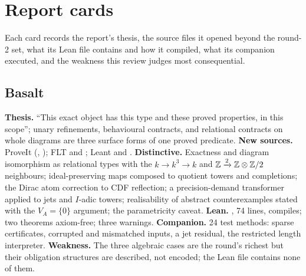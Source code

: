\section{Report cards}\label{app:cards}
Each card records the report's thesis, the source files it opened beyond the round-2 set, what its Lean file contains and how it compiled, what its companion executed, and the weakness this review judges most consequential.

\subsection*{Basalt}
\textbf{Thesis.} ``This exact object has this type and these proved properties, in this scope''; unary refinements, behavioural contracts, and relational contracts on whole diagrams are three surface forms of one proved predicate. \textbf{New sources.} ProveIt  (, ); FLT  and ; Leant  and . \textbf{Distinctive.} Exactness and diagram isomorphism as relational types with the $k\to k^3\to k$ and $\mathbb Z\xrightarrow{2}\mathbb Z\otimes\mathbb Z/2$ neighbours; ideal-preserving maps composed to quotient towers and completions; the Dirac atom correction to CDF reflection; a precision-demand transformer applied to jets and $I$-adic towers; realisability of abstract counterexamples stated with the $V_A=\{0\}$ argument; the parametricity caveat. \textbf{Lean.} , 74 lines, compiles; two theorems axiom-free; three  warnings. \textbf{Companion.} 24 test methods: sparse certificates, corrupted and mismatched inputs, a jet residual, the restricted length interpreter. \textbf{Weakness.} The three algebraic cases are the round's richest but their obligation structures are described, not encoded; the Lean file contains none of them.

